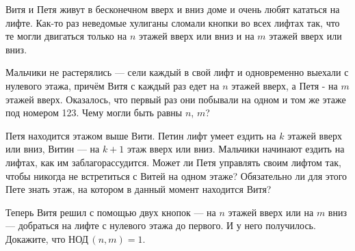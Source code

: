 ﻿

\noindent Витя и Петя живут в бесконечном вверх и вниз доме и очень любят кататься на лифте. Как-то раз неведомые хулиганы сломали кнопки во всех лифтах так, что те могли двигаться только на $n$ этажей вверх или вниз и на $m$ этажей вверх или вниз. 
\begin{itemize}

\itA Мальчики не растерялись — сели каждый в свой лифт и одновременно выехали с нулевого этажа, причём Витя с каждый раз едет на $n$ этажей вверх, а Петя - на $m$ этажей вверх. Оказалось, что первый раз они побывали на одном и том же этаже под номером 123. Чему могли быть равны $n$, $m$?

\itB Петя находится этажом выше Вити. Петин лифт умеет ездить на $k$ этажей вверх или вниз, Витин — на $k+1$ этаж вверх или вниз. Мальчики начинают ездить на лифтах, как им заблагорассудится. Может ли Петя управлять своим лифтом так, чтобы никогда не встретиться с Витей на одном этаже? Обязательно ли для этого Пете знать этаж, на котором в данный момент находится Витя?

\itC Теперь Витя решил с помощью двух кнопок — на $n$ этажей вверх или на $m$ вниз — добраться на лифте с нулевого этажа до первого. И у него получилось. Докажите, что НОД\,$(n,m)=1$.
\end{itemize}